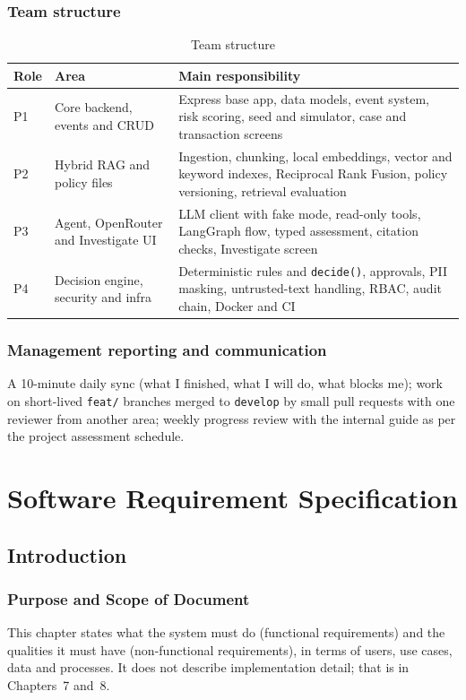 \documentclass[oneside,a4paper,12pt]{report}
\begin{document}
\subsection{Team structure}
\begin{table}[H]
\centering
\begin{tabularx}{\textwidth}{|l|l|X|}
\hline
\textbf{Role} & \textbf{Area} & \textbf{Main responsibility} \\ \hline
P1 & Core backend, events and CRUD & Express base app, data models, event system, risk scoring, seed and simulator, case and transaction screens \\ \hline
P2 & Hybrid RAG and policy files & Ingestion, chunking, local embeddings, vector and keyword indexes, Reciprocal Rank Fusion, policy versioning, retrieval evaluation \\ \hline
P3 & Agent, OpenRouter and Investigate UI & LLM client with fake mode, read-only tools, LangGraph flow, typed assessment, citation checks, Investigate screen \\ \hline
P4 & Decision engine, security and infra & Deterministic rules and \texttt{decide()}, approvals, PII masking, untrusted-text handling, RBAC, audit chain, Docker and CI \\ \hline
\end{tabularx}
\caption{Team structure}
\end{table}

\subsection{Management reporting and communication}
A 10-minute daily sync (what I finished, what I will do, what blocks me); work on short-lived \texttt{feat/} branches merged to \texttt{develop} by small pull requests with one reviewer from another area; weekly progress review with the internal guide as per the project assessment schedule.

\chapter{Software Requirement Specification}

\section{Introduction}
\subsection{Purpose and Scope of Document}
This chapter states what the system must do (functional requirements) and the qualities it must have (non-functional requirements), in terms of users, use cases, data and processes. It does not describe implementation detail; that is in Chapters~7 and~8.
\end{document}

